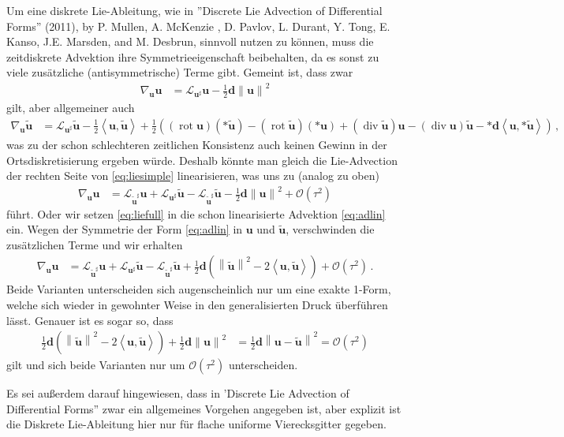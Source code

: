 \documentclass[a4paper,11pt]{scrartcl}
\newcommand{\U}{u} %
\newcommand{\Ub}{\mathbf{\U}} %
\newcommand{\tU}{\tilde{u}} %
\newcommand{\tUb}{\mathbf{\tU}} %
\newcommand{\landau}{\mathcal{O}}
\renewcommand{\div}{\operatorname{div}} %
\newcommand{\rot}{\operatorname{rot}} %
\newcommand{\lie}{\mathcal{L}} %
\newcommand{\exd}{\mathbf{d}} %
\newcommand{\formComma}{\,\text{,}}
\newcommand{\formPeriod}{\,\text{.}}
\begin{document}
Um eine diskrete Lie-Ableitung, wie in ''Discrete Lie Advection of
Differential Forms'' (2011), by P. Mullen, A. McKenzie , D. Pavlov, L.
Durant, Y. Tong, E. Kanso, J.E. Marsden, and M. Desbrun,
sinnvoll nutzen zu können, muss die zeitdiskrete Advektion ihre Symmetrieeigenschaft beibehalten, 
da es sonst zu viele zusätzliche (antisymmetrische) Terme gibt.
Gemeint ist, dass zwar
\begin{align}\label{eq:liesimple}
  \nabla_{\Ub}\Ub &= \lie_{\Ub^{\sharp}}\Ub - \frac{1}{2}\exd\left\| \Ub \right\|^{2}
\end{align}
gilt, aber allgemeiner auch
\begin{align}\label{eq:liefull}
  \nabla_{\Ub}\tUb &= \lie_{\Ub^{\sharp}}\tUb - \frac{1}{2}\left\langle \Ub , \tUb \right\rangle
                          +\frac{1}{2}\left( \left( \rot\Ub \right)\left( *\tUb \right) -  \left( \rot\tUb \right)\left( *\Ub \right)
                          +\left( \div\tUb \right)\Ub - \left( \div\Ub \right)\tUb
                          -*\exd\left\langle \Ub, *\tUb \right\rangle\right)\formComma
\end{align}
was zu der schon schlechteren zeitlichen Konsistenz auch keinen Gewinn in der Ortsdiskretisierung ergeben würde.
Deshalb könnte man gleich die Lie-Advection der rechten Seite von \eqref{eq:liesimple} linearisieren, 
was uns zu  (analog zu oben)
\begin{align}
  \nabla_{\Ub}\Ub &= \lie_{\tUb^{\sharp}}\Ub + \lie_{\Ub^{\sharp}}\tUb - \lie_{\tUb^{\sharp}}\tUb - \frac{1}{2}\exd\left\| \Ub \right\|^{2} + \landau\left( \tau^{2} \right)
\end{align}
führt.
Oder wir setzen \eqref{eq:liefull} in die schon linearisierte Advektion \eqref{eq:adlin} ein.
Wegen der Symmetrie der Form \eqref{eq:adlin} in \( \Ub \) und \( \tUb \), verschwinden die zusätzlichen Terme und wir erhalten
\begin{align}
  \nabla_{\Ub}\Ub &= \lie_{\tUb^{\sharp}}\Ub + \lie_{\Ub^{\sharp}}\tUb - \lie_{\tUb^{\sharp}}\tUb + \frac{1}{2}\exd\left( \left\| \tUb \right\|^{2} - 2\left\langle \Ub, \tUb \right\rangle \right)
                      + \landau\left( \tau^{2} \right) \formPeriod
\end{align}
Beide Varianten unterscheiden sich augenscheinlich nur um eine exakte 1-Form, welche sich wieder in gewohnter Weise in den generalisierten Druck überführen lässt.
Genauer ist es sogar so, dass 
\begin{align}
  \frac{1}{2}\exd\left( \left\| \tUb \right\|^{2} - 2\left\langle \Ub, \tUb \right\rangle \right) + \frac{1}{2}\exd\left\| \Ub \right\|^{2} 
         &= \frac{1}{2}\exd\left\| \Ub-\tUb \right\|^{2} = \landau\left( \tau^{2} \right)
\end{align}
gilt und sich beide Varianten nur um \( \landau\left( \tau^{2} \right) \) unterscheiden.

Es sei außerdem darauf hingewiesen, dass in 'Discrete Lie Advection of
Differential Forms'' zwar ein allgemeines Vorgehen angegeben ist, aber explizit
ist die Diskrete Lie-Ableitung hier nur für flache uniforme Vierecksgitter gegeben.
\end{document}
